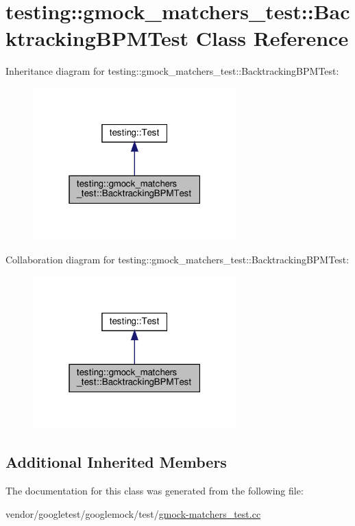 \hypertarget{classtesting_1_1gmock__matchers__test_1_1_backtracking_b_p_m_test}{}\section{testing\+:\+:gmock\+\_\+matchers\+\_\+test\+:\+:Backtracking\+B\+P\+M\+Test Class Reference}
\label{classtesting_1_1gmock__matchers__test_1_1_backtracking_b_p_m_test}


Inheritance diagram for testing\+:\+:gmock\+\_\+matchers\+\_\+test\+:\+:Backtracking\+B\+P\+M\+Test\+:
\nopagebreak
\begin{figure}[H]
\begin{center}
\leavevmode
\includegraphics[width=223pt]{classtesting_1_1gmock__matchers__test_1_1_backtracking_b_p_m_test__inherit__graph}
\end{center}
\end{figure}


Collaboration diagram for testing\+:\+:gmock\+\_\+matchers\+\_\+test\+:\+:Backtracking\+B\+P\+M\+Test\+:
\nopagebreak
\begin{figure}[H]
\begin{center}
\leavevmode
\includegraphics[width=223pt]{classtesting_1_1gmock__matchers__test_1_1_backtracking_b_p_m_test__coll__graph}
\end{center}
\end{figure}
\subsection*{Additional Inherited Members}


The documentation for this class was generated from the following file\+:\begin{DoxyCompactItemize}
\item 
vendor/googletest/googlemock/test/\hyperlink{gmock-matchers__test_8cc}{gmock-\/matchers\+\_\+test.\+cc}\end{DoxyCompactItemize}
